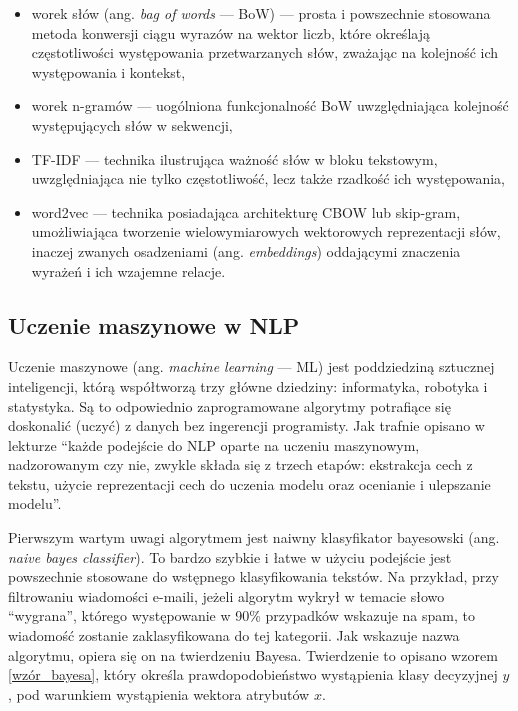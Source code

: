         \begin{itemize}
            \item worek słów (ang. \textit{bag of words} — BoW) — prosta i powszechnie stosowana metoda konwersji ciągu wyrazów na wektor liczb, które określają częstotliwości występowania przetwarzanych słów, zważając na kolejność ich występowania i kontekst,
            \item worek n-gramów — uogólniona funkcjonalność BoW uwzględniająca kolejność występujących słów w sekwencji,
            \item TF-IDF — technika ilustrująca ważność słów w bloku tekstowym, uwzględniająca nie tylko częstotliwość, lecz także rzadkość ich występowania,
            \item word2vec — technika posiadająca architekturę CBOW lub skip-gram, umożliwiająca tworzenie wielowymiarowych wektorowych reprezentacji słów, inaczej zwanych osadzeniami (ang. \textit{embeddings}) oddającymi znaczenia wyrażeń i ich wzajemne relacje.
        \end{itemize}

        
        \subsection{Uczenie maszynowe w NLP}
        Uczenie maszynowe (ang. \textit{machine learning} — ML) jest poddziedziną sztucznej inteligencji, którą współtworzą trzy główne dziedziny: informatyka, robotyka i statystyka. Są to odpowiednio zaprogramowane algorytmy potrafiące się doskonalić (uczyć) z danych bez ingerencji programisty. Jak trafnie opisano w lekturze \cite{sowmya_ksiazka_nlp2023} \enquote{każde podejście do NLP oparte na uczeniu maszynowym, nadzorowanym czy nie, zwykle składa się z trzech etapów: ekstrakcja cech z tekstu, użycie reprezentacji cech do uczenia modelu oraz ocenianie i ulepszanie modelu}.
        
        Pierwszym wartym uwagi algorytmem jest naiwny klasyfikator bayesowski (ang. \textit{naive bayes classifier}). To bardzo szybkie i łatwe w użyciu podejście jest powszechnie stosowane do wstępnego klasyfikowania tekstów. 
        Na przykład, przy filtrowaniu wiadomości e-maili, jeżeli algorytm wykrył w temacie słowo \enquote{wygrana}, którego występowanie w 90\% przypadków wskazuje na spam, to wiadomość zostanie zaklasyfikowana do tej kategorii. Jak wskazuje nazwa algorytmu, opiera się on na twierdzeniu Bayesa. Twierdzenie to opisano wzorem \ref{wzór_bayesa}, który określa prawdopodobieństwo wystąpienia klasy decyzyjnej $y$, pod warunkiem wystąpienia wektora atrybutów $x$. 


